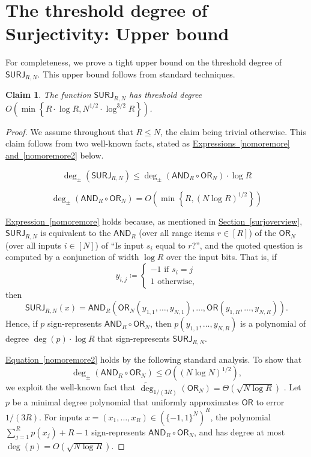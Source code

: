 \documentclass[11pt]{article}
\numberwithin{equation}{section}
\newtheorem{claim}[theorem]{Claim}
\theoremstyle{definition}
\theoremstyle{plain}
\newcommand{\expref}[2]{\hyperref[#2]{#1~\ref{#2}}}
\newcommand{\expeqref}[2]{\hyperref[#2]{#1~\eqref{#2}}}
\newcommand{\SURJ}{\mathsf{ SURJ}}
\newcommand{\OR}{\mathsf{ OR}}
\newcommand{\bits}{\{-1,1\}}
\newcommand{\adeg}{\widetilde{\operatorname{deg}}}
\newcommand{\AND}{\mathsf{AND}}
\begin{document}
\section{The threshold degree of Surjectivity: Upper bound}
\label{app:ub}
For completeness, we prove a tight upper bound on the threshold degree of $\SURJ_{R, N}$.
This upper bound follows from standard techniques.
\begin{claim}
	The function $\SURJ_{R, N}$ has threshold degree $O\left(\min\left\{R  \cdot \log R, N^{1/2} \cdot \log^{3/2} R\right\}\right)$.
\end{claim}
\begin{proof}
	We assume throughout that $R \leq N$, the claim being trivial otherwise.
	This claim follows from two well-known facts, stated as \expeqref{Expressions}{nomoremore} \expeqref{and}{nomoremore2} below.
	
	\begin{equation} \label{nomoremore}\deg_{\pm}(\SURJ_{R, N}) \leq \deg_{\pm}(\AND_R \circ \OR_N) \cdot \log R \end{equation}
	
	\begin{equation} \label{nomoremore2} \deg_{\pm}(\AND_R \circ \OR_N) = O\left(\min\left\{R, (N \log R)^{1/2}\right\}\right) \end{equation}
%
	
	\expeqref{Expression}{nomoremore} holds because, as mentioned in \expref{Section}{surjoverview}, 
	$\SURJ_{R, N}$ is equivalent to the $\AND_R$ (over all range items $r \in [R]$) of the $\OR_N$ (over all inputs $i \in [N]$) of ``Is input $s_i$ equal to $r$?'', and the quoted question is computed by a conjunction of width $\log R$ over the input bits. 
	That is, if $$y_{i,j} \coloneqq  \begin{cases} -1 \text{ if } s_i=j \\ 1 \text{ otherwise,}\end{cases}$$
	then $$\SURJ_{R, N}(x) = \AND_R(\OR_N(y_{1, 1} ,\dots, y_{N, 1}), \dots, \OR(y_{1, R}, \dots, y_{N, R})).$$
	Hence, if $p$ sign-represents $\AND_R \circ \OR_N$, then $p(y_{1, 1}, \dots,  y_{N, R})$ is a polynomial of degree $\deg(p) \cdot \log R$
	that sign-represents $\SURJ_{R, N}$. 
	
	\expeqref{Equation}{nomoremore2} holds by the following standard analysis. 
	To show that $$\deg_{\pm}(\AND_R \circ \OR_N) \leq O((N \log N)^{1/2}),$$ 
	we exploit the well-known fact that $\adeg_{1/(3R)}(\OR_N) = \Theta(\sqrt{N \log R})$ \cite{kahn, buhrman1999bounds}. 
	Let $p$ be a minimal degree polynomial that uniformly approximates $\OR$ to error $1/(3R)$.
	For inputs $x=(x_1, \dots, x_R) \in \left(\bits^{N}\right)^{R}$, 
	the polynomial $\sum_{j=1}^{R} p(x_j) + R-1$ sign-represents $\AND_R \circ \OR_N$,
	and has degree at most $\deg(p) = O(\sqrt{N \log R})$. 
	

\end{proof}
\end{document}
